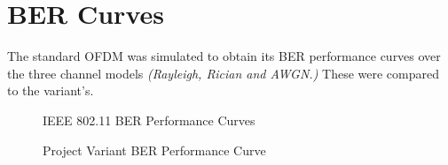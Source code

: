 \section{BER Curves}
The standard \gls{OFDM} was simulated to obtain its \gls{BER} performance curves over the three channel models \emph{(Rayleigh, Rician and AWGN.)} These were compared to the variant's.

\begin{figure}[!h]
	\centerline{}
	\caption{IEEE 802.11 BER Performance Curves}
	\label{res:fig:berstdCurves}
\end{figure}
\begin{figure}[!h]
	\centerline{}
	\caption{Project Variant BER Performance Curve}
	\label{res:fig:bervarCurves}
\end{figure}

\pagebreak
